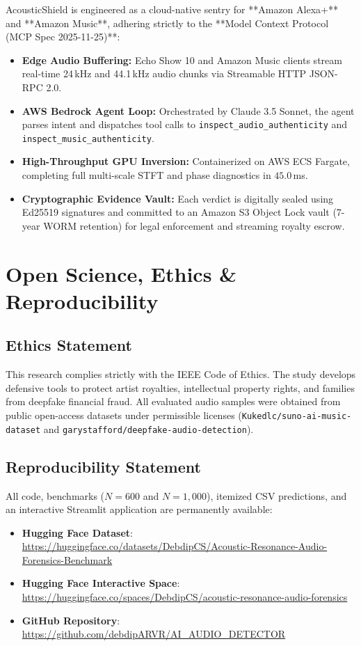 \documentclass[conference]{IEEEtran}
\theoremstyle{definition}
\begin{document}
AcousticShield is engineered as a cloud-native sentry for **Amazon Alexa+** and **Amazon Music**, adhering strictly to the **Model Context Protocol (MCP Spec 2025-11-25)**:
\begin{itemize}
    \item \textbf{Edge Audio Buffering:} Echo Show 10 and Amazon Music clients stream real-time 24\,kHz and 44.1\,kHz audio chunks via Streamable HTTP JSON-RPC 2.0.
    \item \textbf{AWS Bedrock Agent Loop:} Orchestrated by Claude 3.5 Sonnet, the agent parses intent and dispatches tool calls to \texttt{inspect\_audio\_authenticity} and \texttt{inspect\_music\_authenticity}.
    \item \textbf{High-Throughput GPU Inversion:} Containerized on AWS ECS Fargate, completing full multi-scale STFT and phase diagnostics in $45.0$\,ms.
    \item \textbf{Cryptographic Evidence Vault:} Each verdict is digitally sealed using Ed25519 signatures and committed to an Amazon S3 Object Lock vault (7-year WORM retention) for legal enforcement and streaming royalty escrow.
\end{itemize}

\section{Open Science, Ethics \& Reproducibility}

\subsection{Ethics Statement}
This research complies strictly with the IEEE Code of Ethics. The study develops defensive tools to protect artist royalties, intellectual property rights, and families from deepfake financial fraud. All evaluated audio samples were obtained from public open-access datasets under permissible licenses (\texttt{Kukedlc/suno-ai-music-dataset} and \texttt{garystafford/deepfake-audio-detection}).

\subsection{Reproducibility Statement}
All code, benchmarks ($N=600$ and $N=1,000$), itemized CSV predictions, and an interactive Streamlit application are permanently available:
\begin{itemize}
    \item \textbf{Hugging Face Dataset}: \url{https://huggingface.co/datasets/DebdipCS/Acoustic-Resonance-Audio-Forensics-Benchmark}
    \item \textbf{Hugging Face Interactive Space}: \url{https://huggingface.co/spaces/DebdipCS/acoustic-resonance-audio-forensics}
    \item \textbf{GitHub Repository}: \url{https://github.com/debdipARVR/AI_AUDIO_DETECTOR}
\end{itemize}
\end{document}
